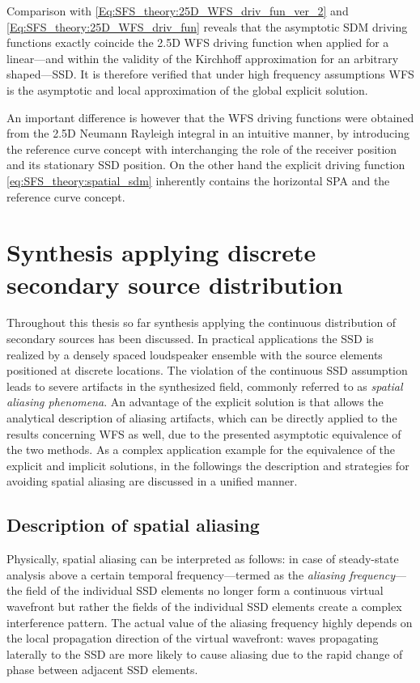 Comparison with \eqref{Eq:SFS_theory:25D_WFS_driv_fun_ver_2} and \eqref{Eq:SFS_theory:25D_WFS_driv_fun} reveals that the asymptotic SDM driving functions exactly coincide the 2.5D WFS driving function when applied for a linear---and within the validity of the Kirchhoff approximation for an arbitrary shaped---SSD.
It is therefore verified that under high frequency assumptions WFS is the asymptotic and local approximation of the global explicit solution.

An important difference is however that the WFS driving functions were obtained from the 2.5D Neumann Rayleigh integral in an intuitive manner, by introducing the reference curve concept with interchanging the role of the receiver position and its stationary SSD position. 
On the other hand the explicit driving function \eqref{eq:SFS_theory:spatial_sdm} inherently contains the horizontal SPA and the reference curve concept.

\section{Synthesis applying discrete secondary source distribution}
\label{Sec:Aliasing}

Throughout this thesis so far synthesis applying the continuous distribution of secondary sources has been discussed.
In practical applications the SSD is realized by a densely spaced loudspeaker ensemble with the source elements positioned at discrete locations.
The violation of the continuous SSD assumption leads to severe artifacts in the synthesized field, commonly referred to as \emph{spatial aliasing phenomena}.
An advantage of the explicit solution is that allows the analytical description of aliasing artifacts, which can be directly applied to the results concerning WFS as well, due to the presented asymptotic equivalence of the two methods.
As a complex application example for the equivalence of the explicit and implicit solutions, in the followings the description and strategies for avoiding spatial aliasing are discussed in a unified manner.

\subsection{Description of spatial aliasing}

Physically, spatial aliasing can be interpreted as follows: in case of steady-state analysis above a certain temporal frequency---termed as the \emph{aliasing frequency}--- the field of the individual SSD elements no longer form a continuous virtual wavefront but rather the fields of the individual SSD elements create a complex interference pattern.
The actual value of the aliasing frequency highly depends on the local propagation direction of the virtual wavefront: waves propagating laterally to the SSD are more likely to cause aliasing due to the rapid change of phase between adjacent SSD elements.

